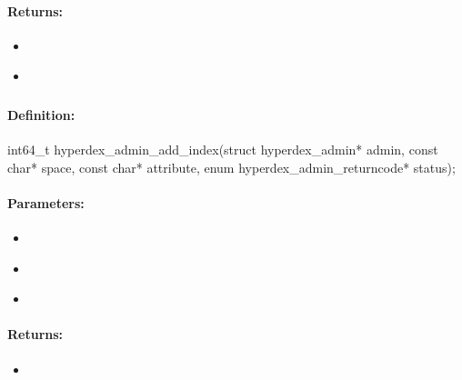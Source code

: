 \paragraph{Returns:}
\begin{itemize}[noitemsep]
\item {}\\

\item {}\\

\end{itemize}

\pagebreak
\subsubsection{}
\label{api:c:add_index}


\paragraph{Definition:}
\begin{ccode}
int64_t hyperdex_admin_add_index(struct hyperdex_admin* admin,
        const char* space,
        const char* attribute,
        enum hyperdex_admin_returncode* status);
\end{ccode}

\paragraph{Parameters:}
\begin{itemize}[noitemsep]
\item {}\\

\item {}\\

\item {}\\

\end{itemize}

\paragraph{Returns:}
\begin{itemize}[noitemsep]
\item {}\\

\end{itemize}

